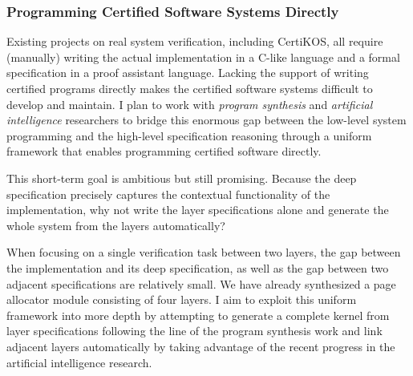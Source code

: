 \documentclass[a4paper, 10pt]{article}
\begin{document}
\begin{small}
\subsubsection*{\small Programming Certified Software Systems Directly}
Existing  projects on real system verification,
including CertiKOS, all require   (manually)  writing the actual implementation
 in a C-like language and a formal specification in a proof assistant language.
Lacking the support of  writing certified  programs  directly makes the certified  software systems difficult to develop and maintain. I plan to work with \emph{program synthesis} 
and \emph{artificial intelligence} researchers to bridge this enormous gap between the low-level system programming and the high-level specification reasoning
through
a uniform framework that enables programming certified software directly.

This short-term goal is ambitious but still promising.
Because the deep specification
precisely captures the contextual functionality of the implementation, why not write the layer specifications alone
and generate the whole system from the layers automatically?
\begin{comment}
I plan to extend the CertiKOS
framework such that the layer specification can be smartly 
``compiled" into C programs that meet the specification
and the layers at different abstract level can be linked together in a mostly automated way.
\end{comment}
When focusing on a single verification task between two layers,
 the gap between the implementation and its deep specification, as well as the gap between two adjacent specifications
are relatively small.  We have already synthesized
a page allocator module consisting of four layers. 
I aim to  exploit this uniform framework into more depth by attempting to generate a complete kernel
 from layer specifications
following the line of the program synthesis work
and link adjacent layers automatically
by taking advantage of the recent progress in the
artificial intelligence research.


\end{small}
\end{document}
